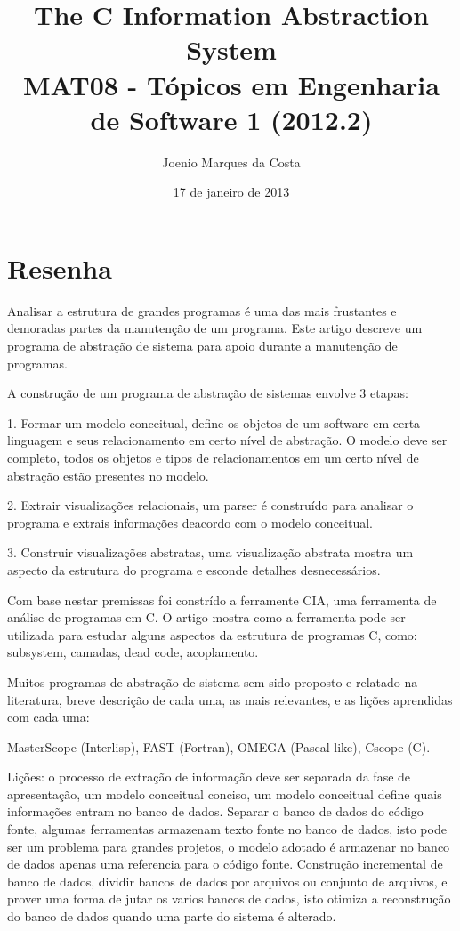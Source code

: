 \documentclass[12pt]{article}
\title{The C Information Abstraction System
 \cite{TheCInformation}\\
 \large MAT08 - Tópicos em Engenharia de Software 1 (2012.2)}
\author{Joenio Marques da Costa}
\date{17 de janeiro de 2013}
\begin{document}
\maketitle

\section*{Resenha}

Analisar a estrutura de grandes programas é uma das mais frustantes e demoradas
partes da manutenção de um programa. Este artigo descreve um programa de abstração
de sistema para apoio durante a manutenção de programas.

A construção de um programa de abstração de sistemas envolve 3 etapas:

1. Formar um modelo conceitual, define os objetos de um software em certa linguagem
e seus relacionamento em certo nível de abstração. O modelo deve ser completo, todos
os objetos e tipos de relacionamentos em um certo nível de abstração estão presentes no
modelo.

2. Extrair visualizações relacionais, um parser é construído para analisar o programa
e extrais informações deacordo com o modelo conceitual.

3. Construir visualizações abstratas, uma visualização abstrata mostra um aspecto
da estrutura do programa e esconde detalhes desnecessários.

Com base nestar premissas foi constrído a ferramente CIA, uma ferramenta de análise
de programas em C. O artigo mostra como a ferramenta pode ser utilizada para estudar
alguns aspectos da estrutura de programas C, como: subsystem, camadas, dead code,
acoplamento.\cite{ExtracaoDeDependencias}

Muitos programas de abstração de sistema sem sido proposto e relatado na literatura,
breve descrição de cada uma, as mais relevantes, e as lições aprendidas com cada uma:

MasterScope (Interlisp), FAST (Fortran), OMEGA (Pascal-like), Cscope (C).

Lições: o processo de extração de informação deve ser separada da fase de apresentação,
um modelo conceitual conciso, um modelo conceitual define quais informações entram
no banco de dados. Separar o banco de dados do código fonte, algumas ferramentas
armazenam texto fonte no banco de dados, isto pode ser um problema para grandes projetos,
o modelo adotado é armazenar no banco de dados apenas uma referencia para o código fonte.
Construção incremental de banco de dados, dividir bancos de dados por arquivos ou
conjunto de arquivos, e prover uma forma de jutar os varios bancos de dados, isto
otimiza a reconstrução do banco de dados quando uma parte do sistema é alterado.



\end{document}

